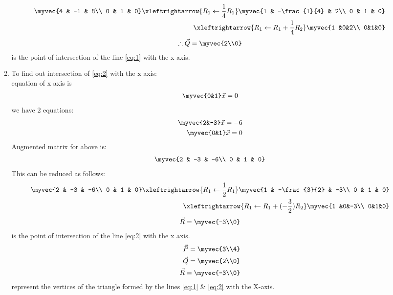 \documentclass[journal,12pt,twocolumn]{IEEEtran}
\renewcommand\thesection{\arabic{section}}
\begin{document}
\begin{enumerate}[label=\thesection.\arabic*.,ref=\thesection.\theenumi]
\begin{enumerate}
\begin{align}
    \myvec{4 & -1 & 8\\
           0 & 1 & 0}
    \xleftrightarrow {R_1 \leftarrow \frac{1}{4}R_1}
    \myvec{1 & -\frac{1}{4} & 2\\
          0 & 1 & 0}\\
          \xleftrightarrow{R_1 \leftarrow R_1 + \frac{1}{4}R_2}
    \myvec{1 &0&2\\
        0&1&0}\\
\end{align}
\begin{align}
\therefore \vec{Q}=\myvec{2\\0}
\end{align}
is the point of intersection of the line \eqref{eq:1} with the x axis.
\item To find out intersection of \eqref{eq:2} with the x axis:\\
    equation of x axis is 
        \begin{align}
        \myvec{0&1}\vec{x}=0
    \end{align}
    we have 2 equations: \begin{align}
        \myvec{2&-3}\vec{x}=-6\\
        \myvec{0&1}\vec{x}=0
    \end{align}
    Augmented matrix for above is:
\begin{align}
    \myvec{2 & -3 & -6\\
           0 & 1 & 0}
\end{align}
This can be reduced as follows:\\
\begin{align}
    \myvec{2 & -3 & -6\\
           0 & 1 & 0}
    \xleftrightarrow {R_1 \leftarrow \frac{1}{2}R_1}
    \myvec{1 & -\frac{3}{2} & -3\\
          0 & 1 & 0}\\
          \xleftrightarrow{R_1 \leftarrow R_1 + (-\frac{3}{2})R_2}
    \myvec{1 &0&-3\\
        0&1&0}\\
\end{align}
\begin{align}
    \vec{R}=\myvec{-3\\0}
\end{align}
is the point of intersection of the line \eqref{eq:2} with the x axis.
\\
    \begin{align}
        \vec{P}=\myvec{3\\4}\\ \vec{Q}=\myvec{2\\0}\\ \vec{R}=\myvec{-3\\0}\\
    \end{align}
    represent the vertices of the triangle formed by the lines \eqref{eq:1} \& \eqref{eq:2}
    with the X-axis.\\\\


\end{enumerate}
\end{enumerate}
\end{document}
